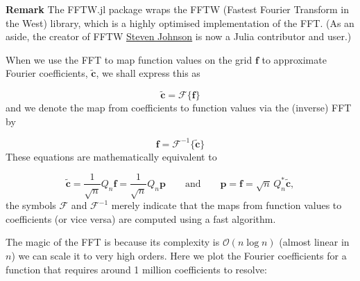\documentclass[12pt,a4paper]{article}
\begin{document}
\textbf{Remark} The FFTW.jl package wraps the FFTW (Fastest Fourier Transform in the West) library, which is a highly optimised implementation of the FFT. (As an aside, the creator of FFTW \href{https://math.mit.edu/~stevenj/}{Steven Johnson} is now a Julia contributor and user.)

When we use the FFT to map function values on the grid $\mathbf{f}$ to approximate Fourier coefficients, $\tilde{\mathbf{c}}$, we shall express this as

\[
\tilde{\mathbf{c}} = \mathcal{F}\lbrace \mathbf{f}  \rbrace
\]
and we denote the map from coefficients to function values via the (inverse) FFT by

\[
\mathbf{f}  = \mathcal{F}^{-1}\lbrace \tilde{\mathbf{c}} \rbrace
\]
These equations are mathematically equivalent to 

\[
\tilde{\mathbf{c}} =  \frac{1}{\sqrt{n}}Q_{n}\mathbf{f} =  \frac{1}{\sqrt{n}}Q_{n}\mathbf{p} \qquad \text{and} \qquad \mathbf{p} = \mathbf{f} = \sqrt{n}\,Q_{n}^*\tilde{\mathbf{c}},
\]
the symbols $\mathcal{F}$ and $\mathcal{F}^{-1}$ merely indicate that the maps from function values to coefficients (or vice versa) are computed using a fast algorithm.

The magic of the FFT is because its complexity is $\mathcal{O}(n \log n)$ (almost linear in $n$) we can scale it to very high orders. Here we plot the Fourier coefficients for a function that requires around 1 million coefficients to resolve:
\end{document}
